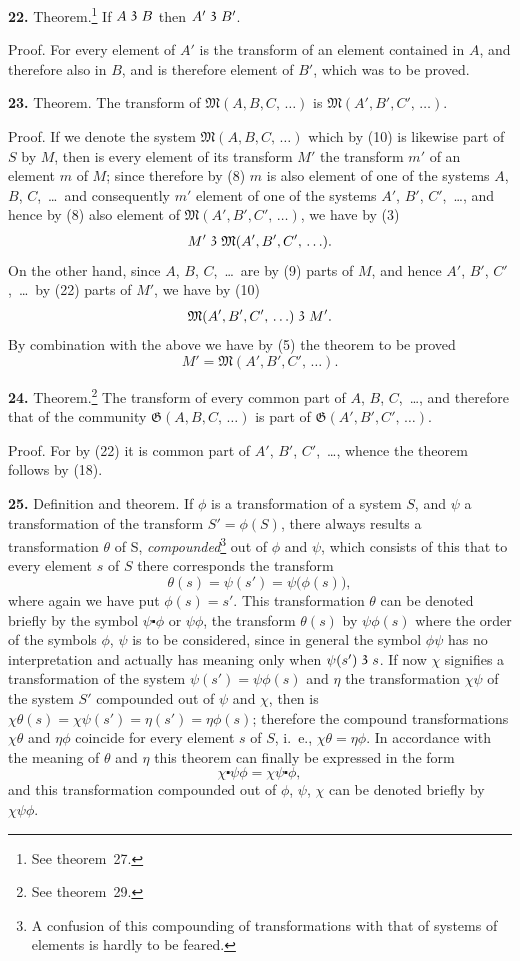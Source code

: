 \documentclass[oneside]{book}
\newcommand\partof{\mathrel{\raisebox{0.45ex}{$\mathfrak{3}$}}}   %
\newcommand\mypara{\medskip\textbf}
\begin{document}
\mypara{22.} Theorem.\footnote{See theorem~27.} If $A \partof B$ then $A' \partof B'$.

Proof. For every element of $A'$ is the transform
of an element contained in $A$, and therefore also in $B$,
and is therefore element of $B'$, which was to be proved.

\mypara{23.} Theorem. The transform of $\mathfrak{M}(A, B, C,\,\ldots)$
is $\mathfrak{M}(A', B', C',\,\ldots)$.

Proof. If we denote the system $\mathfrak{M}(A, B, C,\, \ldots)$
which by (10) is likewise part of $S$ by $M$, then is every
element of its transform $M'$ the transform $m'$ of an
element $m$ of $M$; since therefore by (8) $m$ is also element
of one of the systems $A$, $B$, $C$,~\ldots\ and consequently
$m'$ element of one of the systems $A'$, $B'$, $C'$,~\ldots,
and hence by (8) also element of $\mathfrak{M}(A', B', C',\, \ldots)$,
we have by (3)
\[
M' \partof \mathfrak{M}(A', B', C',\,\ldots).
\]
On the other hand, since $A$, $B$, $C$,~\ldots\ are by (9) parts
of $M$, and hence $A'$, $B'$, $C'$,~\ldots\ by (22) parts of $M'$,
we have by (10)
\[
\mathfrak{M}(A', B', C',\,\ldots) \partof M'.
\]
By combination with the above we have by (5) the
theorem to be proved
\[
M' = \mathfrak{M}(A', B', C',\, \ldots).
\]


\mypara{24.} Theorem.\footnote{See theorem~29.} The transform of every common
part of $A$, $B$, $C$,~\ldots, and therefore that of the community
$\mathfrak{G}(A, B, C,\,\ldots)$ is part of $\mathfrak{G}(A', B', C',\,\ldots)$.

Proof. For by (22) it is common part of $A'$, $B'$,
$C'$,~\ldots, whence the theorem follows by (18).

\mypara{25.} Definition and theorem. If $\phi$ is a transformation
of a system $S$, and $\psi$ a transformation of the
transform $S'=\phi(S)$, there always results a transformation
$\theta$ of S, \textit{compounded}\footnote
  {A confusion of this compounding of transformations with that of systems
  of elements is hardly to be feared.}
out of $\phi$ and $\psi$, which consists
of this that to every element $s$ of $S$ there corresponds
the transform
\[
  \theta(s)=\psi(s')=\psi\bigl(\phi(s)\bigr),
\]
where again we have put $\phi(s)=s'$. This transformation
$\theta$ can be denoted briefly by the symbol $\psi\centerdot\phi$ or
$\psi\phi$, the transform $\theta(s)$ by $\psi\phi(s)$ where the order of
the symbols $\phi$, $\psi$ is to be considered, since in general
the symbol $\phi\psi$ has no interpretation and actually has
meaning only when $\psi(s') \partof s$. If now $\chi$ signifies a
transformation of the system $\psi(s')=\psi\phi(s)$ and $\eta$ the
transformation $\chi\psi$ of the system $S'$ compounded out
of $\psi$ and $\chi$, then is $\chi\theta(s)=\chi\psi(s')=\eta(s')=\eta\phi(s)$;
therefore the compound transformations $\chi\theta$ and $\eta\phi$
coincide for every element $s$ of $S$, i.~e., $\chi\theta = \eta \phi$. In
accordance with the meaning of $\theta$ and $\eta$ this theorem
can finally be expressed in the form
\[
  \chi\centerdot\psi\phi = \chi\psi\centerdot\phi,
\]
and this transformation compounded out of $\phi$, $\psi$, $\chi$
can be denoted briefly by $\chi\psi\phi$.
\end{document}
